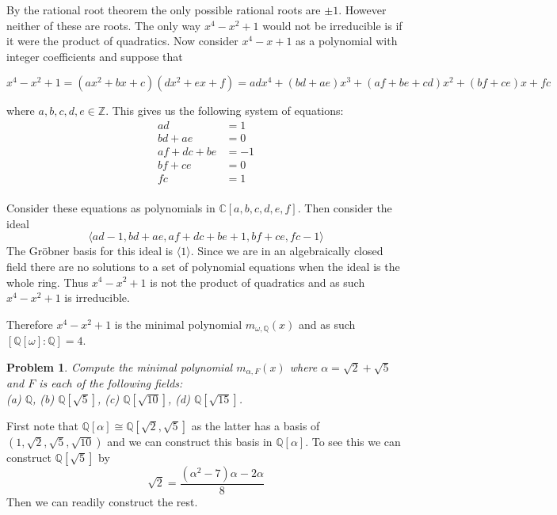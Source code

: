 \documentclass[10pt]{article}
\newcommand{\bb}[1]{\mathbb{#1}}
\theoremstyle{plain}
\newtheorem{problem}{Problem}
\theoremstyle{remark}
\begin{document}
By the rational root theorem the only possible rational roots are $\pm 1$.
However neither of these are roots. The only way $x^4-x^2+1$ would not
be irreducible is if it were the product of quadratics. Now consider
$x^4-x+1$ as a polynomial with integer coefficients and suppose that

\[x^4-x^2+1 = (ax^2+bx+c)(dx^2+ex+f)=adx^4+(bd+ae)x^3+(af+be+cd)x^2+(bf+ce)x+fc\]

where $a,b,c,d,e\in\bb{Z}$. This gives us the following system of equations:
\begin{align*}
  ad &=1\\
  bd+ae &= 0\\
  af+dc+be &= -1\\
  bf+ce &=0 \\
  fc &= 1\\
\end{align*}

Consider these equations as polynomials in $\bb{C}[a,b,c,d,e,f]$. Then
consider the ideal
\[ \langle ad-1,bd+ae,af+dc+be+1,bf+ce,fc-1\rangle \]
The Gr\"obner basis for this ideal is $\langle 1\rangle$. Since we are in an algebraically
closed field there are no solutions to a set of polynomial equations when
the ideal is the whole ring. Thus $x^4-x^2+1$ is not the product of quadratics
and as such $x^4-x^2+1$ is irreducible.

Therefore $x^4-x^2+1$ is the minimal polynomial $m_{\omega,\bb{Q}}(x)$ and as such
$[\bb{Q}[\omega]:\bb{Q}]=4$.

\begin{problem}
  Compute the minimal polynomial $m_{\alpha,F}(x)$ where
  $\alpha = \sqrt{2} + \sqrt{5}$ and $F$ is each of the following fields:\\
  (a) $\mathbb{Q}$, \hspace{1cm} (b)
  $\mathbb{Q}[\sqrt{5}]$, \hspace{1cm} (c) $\mathbb{Q}[\sqrt{10}]$,
  \hspace{1cm} (d) $\mathbb{Q}[\sqrt{15}]$.
\end{problem}

First note that $\bb{Q}[\alpha]\cong\bb{Q}[\sqrt{2},\sqrt{5}]$ as the latter has a
basis of $(1,\sqrt{2},\sqrt{5},\sqrt{10})$ and we can construct this basis
in $\bb{Q}[\alpha]$. To see this we can construct $\bb{Q}[\sqrt{5}]$ by
\[ \sqrt{2}=\frac{(\alpha^2-7)\alpha-2\alpha}{8}\]
Then we can readily construct the rest.
\end{document}
